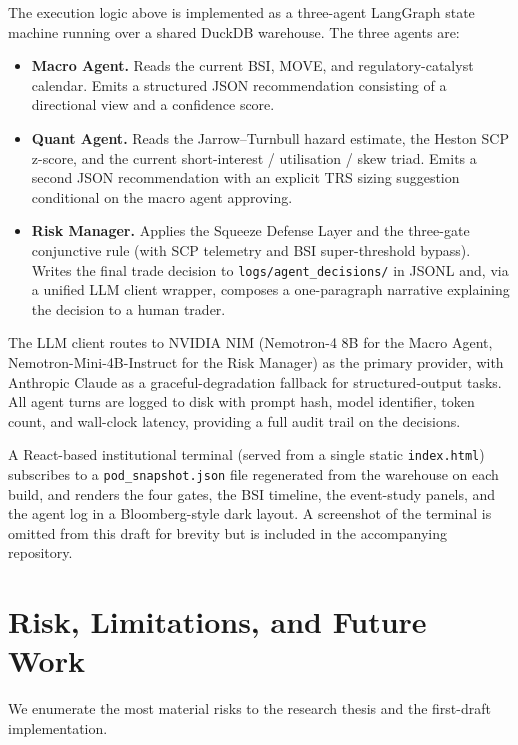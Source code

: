 \documentclass[11pt,letterpaper]{article}
\begin{document}
The execution logic above is implemented as a three-agent LangGraph
state machine running over a shared DuckDB warehouse. The three
agents are:

\begin{itemize}[leftmargin=2em]
\item \textbf{Macro Agent.} Reads the current BSI, MOVE, and
regulatory-catalyst calendar. Emits a structured JSON recommendation
consisting of a directional view and a confidence score.
\item \textbf{Quant Agent.} Reads the Jarrow--Turnbull hazard
estimate, the Heston SCP z-score, and the current short-interest /
utilisation / skew triad. Emits a second JSON recommendation with
an explicit TRS sizing suggestion conditional on the macro agent
approving.
\item \textbf{Risk Manager.} Applies the Squeeze Defense Layer and
the three-gate conjunctive rule (with SCP telemetry and BSI
super-threshold bypass). Writes the final trade decision to
\texttt{logs/agent\_decisions/} in JSONL and, via a unified LLM
client wrapper, composes a one-paragraph narrative explaining the
decision to a human trader.
\end{itemize}

The LLM client routes to NVIDIA NIM (Nemotron-4 8B for the Macro
Agent, Nemotron-Mini-4B-Instruct for the Risk Manager) as the primary
provider, with Anthropic Claude as a graceful-degradation fallback
for structured-output tasks. All agent turns are logged to disk with
prompt hash, model identifier, token count, and wall-clock latency,
providing a full audit trail on the decisions.

A React-based institutional terminal (served from a single static
\texttt{index.html}) subscribes to a \texttt{pod\_snapshot.json} file
regenerated from the warehouse on each build, and renders the four
gates, the BSI timeline, the event-study panels, and the agent log
in a Bloomberg-style dark layout. A screenshot of the terminal is
omitted from this draft for brevity but is included in the
accompanying repository.


\section{Risk, Limitations, and Future Work}
\label{sec:risk}

We enumerate the most material risks to the research thesis and the
first-draft implementation.
\end{document}
